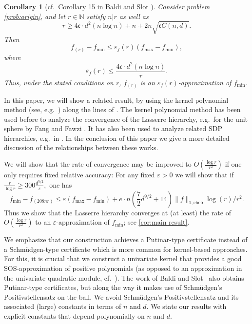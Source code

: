 \documentclass[11pt]{article}
\newcommand{\N}{\mathbb{N}}
\renewcommand{\min}{\mathrm{min}}
\renewcommand{\max}{\mathrm{max}}
\newtheorem{corollary}[defin]{Corollary}
\theoremstyle{definition}
\newcommand{\cheb}{{1,\mathrm{cheb}}}
\newcommand{\Chebyconst}{\mathfrak{c}}
\begin{document}
\begin{corollary}[cf.\  Corollary 15 in Baldi and Slot \cite{doi:10.1137/23M1555430}]
\label{cor:Baldi_Slot}
Consider problem \eqref{prob:origin}, and let $r \in \N$ satisfy $n|r$ as well as
\[
r\ge  4 \Chebyconst \cdot d^2(n\log n) + n  + 2n\sqrt{\Chebyconst C(n,d)}.
\]
Then
\[
f_{(r)} - f_\min \le \varepsilon_f(r)(f_\max - f_\min),
\]
where
\[
\varepsilon_f(r) \le \frac{4 \Chebyconst \cdot d^2(n\log n)}{r}.
\]
Thus, under the stated conditions on $r$, $f_{(r)}$ is an $\varepsilon_f(r)$-approximation of $f_\min$.
\end{corollary}



In this paper, we will show a related result, by using the kernel polynomial method (see, e.g.~\cite{RevModPhys.78.275})
along the lines of \cite{De_Klerk_Vera_2024}.
The kernel polynomial method has been used before to analyze the convergence of the Lasserre hierarchy, e.g.\ for the unit sphere by Fang and Fawzi \cite{10.1007/s10107-020-01537-7}. It has also been used to analyze related SDP hierarchies, e.g.\ in \cite{Laurent2021AnEV,doi:10.1137/22M1540818}. In the conclusion of this paper we give a more detailed discussion of the relationships between these works.

We will show that the rate of convergence may be improved to $O\left(\frac{\log r}{r^2} \right)$ if one only requires fixed relative accuracy: For
any fixed $\varepsilon > 0$ we will show that
{if
$
\frac{r}{\log r} \ge 300\frac{d^{5/2}}{\varepsilon},
$
 one has
\[
f_\min - f_{(208nr)} \le \varepsilon(f_\max - f_\min) + e\cdot n\left( {\frac{7}{2}d^{9/2}} + 14\right)\|f\|_\cheb \log(r)/r^2.
\]
 Thus we show that the Lasserre hierarchy converges at (at least) the  rate of
$O\left(\frac{\log r}{r^2} \right)$ to an $\varepsilon$-approximation of $f_\min$;
 see  \cref{cor:main result}.}



We emphasize that our construction achieves a Putinar-type certificate instead of a Schm\"udgen-type certificate which is more common for kernel-based approaches. For this, it is crucial that we construct a univariate kernel that provides a good SOS-approximation of positive polynomials (as opposed to an approximation in the univariate quadratic module, cf.~\cite{De_Klerk_Vera_2024}). The work of Baldi and Slot~\cite{doi:10.1137/23M1555430} also obtains Putinar-type certificates, but along the way it makes use of Schm\"udgen's Positivstellensatz on the ball. We avoid Schm\"udgen's Positivstellensatz and its associated (large) constants in terms of $n$ and $d$. We state our results with explicit constants that depend polynomially on $n$ and $d$.
\end{document}
